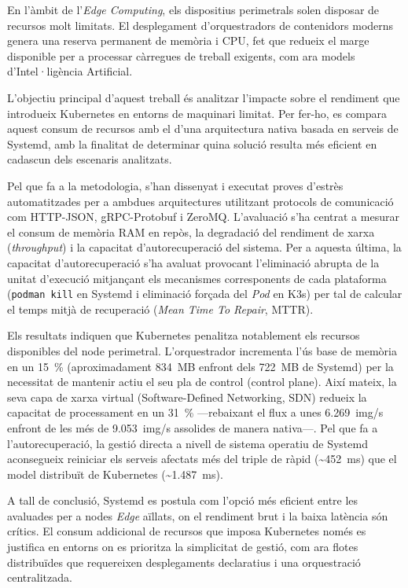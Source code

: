 %


En l'àmbit de l'\textit{Edge Computing}, els dispositius perimetrals solen disposar de recursos molt limitats. El desplegament d'orquestradors de contenidors moderns genera una reserva permanent de memòria i CPU, fet que redueix el marge disponible per a processar càrregues de treball exigents, com ara models d'Intel·ligència Artificial.

L'objectiu principal d'aquest treball és analitzar l'impacte sobre el rendiment que introdueix Kubernetes en entorns de maquinari limitat. Per fer-ho, es compara aquest consum de recursos amb el d'una arquitectura nativa basada en serveis de Systemd, amb la finalitat de determinar quina solució resulta més eficient en cadascun dels escenaris analitzats.

Pel que fa a la metodologia, s'han dissenyat i executat proves d'estrès automatitzades per a ambdues arquitectures utilitzant protocols de comunicació com HTTP-JSON, gRPC-Protobuf i ZeroMQ. L'avaluació s'ha centrat a mesurar el consum de memòria RAM en repòs, la degradació del rendiment de xarxa (\textit{throughput}) i la capacitat d'autorecuperació del sistema. Per a aquesta última, la capacitat d'autorecuperació s'ha avaluat provocant l'eliminació abrupta de la unitat d'execució mitjançant els mecanismes corresponents de cada plataforma (\texttt{podman kill} en Systemd i eliminació forçada del \textit{Pod} en K3s) per tal de calcular el temps mitjà de recuperació (\textit{Mean Time To Repair}, MTTR).

Els resultats indiquen que Kubernetes penalitza notablement els recursos disponibles del node perimetral. L'orquestrador incrementa l'ús base de memòria en un 15~\% (aproximadament 834~MB enfront dels 722~MB de Systemd) per la necessitat de mantenir actiu el seu pla de control (control plane). Així mateix, la seva capa de xarxa virtual (Software-Defined Networking, SDN) redueix la capacitat de processament en un 31~\% ---rebaixant el flux a unes 6.269~img/s enfront de les més de 9.053~img/s assolides de manera nativa---. Pel que fa a l'autorecuperació, la gestió directa a nivell de sistema operatiu de Systemd aconsegueix reiniciar els serveis afectats més del triple de ràpid (\textasciitilde 452~ms) que el model distribuït de Kubernetes (\textasciitilde 1.487~ms).

A tall de conclusió, Systemd es postula com l'opció més eficient entre les avaluades per a nodes \textit{Edge} aïllats, on el rendiment brut i la baixa latència són crítics. El consum addicional de recursos que imposa Kubernetes només es justifica en entorns on es prioritza la simplicitat de gestió, com ara flotes distribuïdes que requereixen desplegaments declaratius i una orquestració centralitzada.